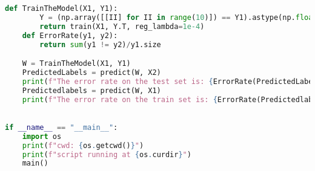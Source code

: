 \documentclass[]{article}
\begin{document}
\begin{lstlisting}[language=python]
    def TrainTheModel(X1, Y1):
        Y = (np.array([[II] for II in range(10)]) == Y1).astype(np.float)
        return train(X1, Y.T, reg_lambda=1e-4)
    def ErrorRate(y1, y2):
        return sum(y1 != y2)/y1.size

    W = TrainTheModel(X1, Y1)
    PredictedLabels = predict(W, X2)
    print(f"The error rate on the test set is: {ErrorRate(PredictedLabels, Y2)}")
    Predictedlabels = predict(W, X1)
    print(f"The error rate on the train set is: {ErrorRate(Predictedlabels, Y1)}")
 

if __name__ == "__main__":
    import os
    print(f"cwd: {os.getcwd()}")
    print(f"script running at {os.curdir}")
    main()
        \end{lstlisting}


        
\end{document}
